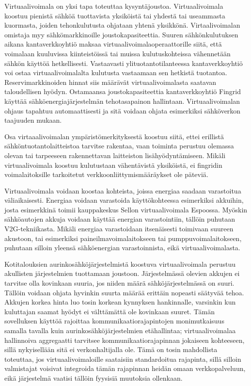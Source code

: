   Virtuaalivoimala on yksi tapa toteuttaa kysyntäjoustoa. Virtuaalivoimala koostuu pienistä sähköä tuottavista yksiköistä tai yhdestä tai useammasta kuormasta, joiden tehonkulutusta ohjataan yhtenä yksikkönä. Virtaalivoimalan omistaja myy sähkömarkkinoille joustokapasiteettia. Suuren sähkönkulutuksen aikana kantaverkkoyhtiö maksaa virtuaalivoimalaoperaattorille siitä, että voimalaan kuuluvissa kiinteistöissä tai muissa kulutuskohteissa vähennetään sähkön käyttöä hetkellisesti. Vastaavasti ylituotantotilanteessa kantaverkkoyhtiö voi ostaa virtuaalivoimalalta kulutusta vastaamaan sen hetkistä tuotantoa. Reservimarkkinoiden hinnat siis määrävät virtuaalivoimalasta saatavan taloudellisen hyödyn. Ostamaansa joustokapasiteettia kantaverkkoyhtiö Fingrid käyttää sähköenergiajärjestelmän tehotasapainon hallintaan. Virtuaalivoimalan ohjaus tapahtuu automaattisesti ja sitä voidaan ohjata esimerkiksi sähköverkon taajuuden mukaan.\parencite{fingrid}

  Osa virtaaalivoimalan ympäristömerkityksestä koostuu siitä, ettei erillistä sähköntuotantolaitteistoa tarvitse rakentaa, vaan toiminta perustuu olemassa olevan tai tarpeeseen rakennettavan laitteiston lisähyödyntämiseen. Mikäli virtuaalivoimala koostuu kulutustaan vähentävistä yksiköistä, ei fingridin voimalaitoksille tarkoitetut verkkoonliittymismääräykset ole päteviä\parencite{VJV2018}.

  Virtuaalivoimala voidaan koostaa kohteista, joissa energiaa saadaan varastoitua väliaikaisesti. Energiaa voidaan varastoida käyttökohteessa esimerkiksi akkuihin, josta esimerkkinä toimii kauppakeskus Sellon virtuaalivoimala Espoossa\parencite{sello}. Myöskin sähköautojen akkuja voidaan käyttää energian varastointiin, tällöin puhutaan \gls{V2G}-tekniikasta\parencite{dictOfEnergy}. Mikäli energiaa varastoidaan itsenäisesti toimivaan suureen akustoon, tai esimerkiksi paineilmavoimalaitokseen tai pumppuvoimalaitokseen, puhutaan silloin yleensä sähköenergian varastoinnista, eikä virtuaalivoimalasta\parencite{dictOfEnergy}.

  Kotitalouksien aurinkosähköjärjestelmistä koostuva virtuaalivoimala perustuu akullisten järjestelmien tuottamaan joustoon. Järjestelmässä olevien akkujen ei tarvitse olla kovinkaan suuria, jos niiden määrä sähköjärjestelmässä on suuri. Tällöin voidaan ohjata hyvinkin suurta määrää erittäin nopeasti säätyvää tehoa. Akkujen korkea hinta luo tosin korkean kynnyksen hankinnalle, varsinkin kun kuluttajan saamat hyödyt ei välttämättä ole kovinkaan suuret. Tämän sovelluksen käyttöä rajoittaa kommunikaatiorajapintojen monimutkaisuus samalla tavalla kuin aurinkosähköjärjestelmien etähallintaa; virtuaalivoimalaa hallinnoiva aggregaatti tarvitsee kommunikaatiorajapinnan jokaiseen kohteeseen, sillä nykyisellään sitä ei verkonhaltijalla ole. Tämä on tosin mahdollista toteuttaa, jos virtuaalivoimaloille saataisiin standardoitua rajapinta, sillä silloin valmistajat voisivat integroida tämän rajapinnan heidän omaan verkkopalveluun, eikä järjestelmä vaatisi tällöin fyysisiä muutoksia ollenkaan.

